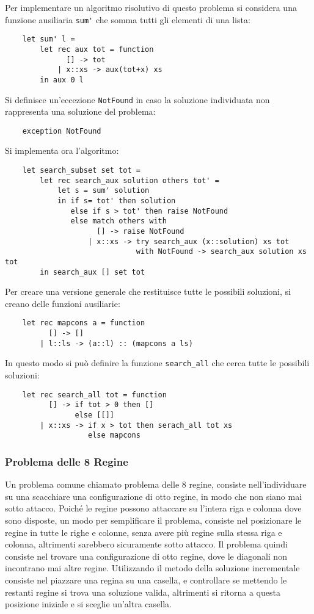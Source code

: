 \documentclass{article}
\numberwithin{equation}{subsection}
\begin{document}
Per implementare un algoritmo risolutivo di questo problema si considera una funzione ausiliaria \verb|sum'| che somma tutti gli elementi di una lista:
\begin{verbatim}
    let sum' l =
        let rec aux tot = function
              [] -> tot
            | x::xs -> aux(tot+x) xs
        in aux 0 l
\end{verbatim}

Si definisce un'eccezione \verb|NotFound| in caso la soluzione individuata non rappresenta una soluzione del problema:
\begin{verbatim}
    exception NotFound
\end{verbatim}
Si implementa ora l'algoritmo:
\begin{verbatim}
    let search_subset set tot = 
        let rec search_aux solution others tot' =
            let s = sum' solution
            in if s= tot' then solution
               else if s > tot' then raise NotFound
               else match others with
                     [] -> raise NotFound
                   | x::xs -> try search_aux (x::solution) xs tot
                              with NotFound -> search_aux solution xs tot
        in search_aux [] set tot
\end{verbatim}



Per creare una versione generale che restituisce tutte le possibili soluzioni, si creano delle funzioni ausiliarie:
\begin{verbatim}
    let rec mapcons a = function
          [] -> []
        | l::ls -> (a::l) :: (mapcons a ls)
\end{verbatim}

In questo modo si può definire la funzione \verb|search_all| che cerca tutte le possibili soluzioni:
\begin{verbatim}
    let rec search_all tot = function
          [] -> if tot > 0 then []
                else [[]] 
        | x::xs -> if x > tot then serach_all tot xs
                   else mapcons 
\end{verbatim}

\subsubsection{Problema delle 8 Regine}

Un problema comune chiamato problema delle 8 regine, consiste nell'individuare su una scacchiare una configurazione di otto regine, in modo che non siano mai sotto attacco. Poiché le regine possono attaccare su l'intera riga e colonna dove sono disposte, un modo per semplificare il problema, consiste nel posizionare le regine in tutte le righe e colonne, senza avere più regine sulla stessa riga e colonna, altrimenti sarebbero sicuramente sotto attacco. 
Il problema quindi consiste nel trovare una configurazione di otto regine, dove le diagonali non incontrano mai altre regine. 
Utilizzando il metodo della soluzione incrementale consiste nel piazzare una regina su una casella, e controllare se mettendo le restanti regine si trova una soluzione valida, altrimenti si ritorna a questa posizione iniziale e si sceglie un'altra casella. 
\end{document}
